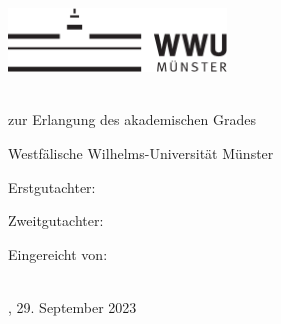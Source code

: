 \thispagestyle{empty}

\begin{center}
    \includegraphics[height=1.7cm]{logos/wwu.pdf}
    \hfill
    \par
    \vspace*{8ex}
    {
        \linespread{0.9}
        \LARGE
        \printtitle
        \par
    }
    \normalsize
    \vspace*{8ex}
    \large
    \textsc{\printtype}\\
    \normalsize
    zur Erlangung des akademischen Grades\\
    \large
    \textsc{\printdegree}
    \par
    \normalsize
    \vspace*{6ex}
    Westfälische Wilhelms-Universität Münster\\
    \printinstitute
\end{center}

\par
\vspace*{6ex}
Erstgutachter:\\
\large
\textit{\printfirstassessor}

\par
\normalsize
\vspace*{2ex}
Zweitgutachter:\\
\large
\textit{\printsecondassessor}

\par
\normalsize
\vspace*{2ex}
Eingereicht von: \\ %
\large
\textit{\printname} \\ %





\par
\normalsize
\vspace*{4ex}
\printcity, 29. September 2023 %
